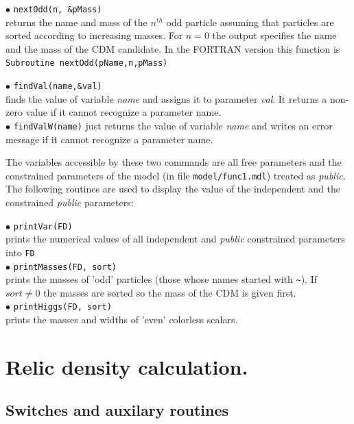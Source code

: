 \documentclass[12pt,a4paper]{article}
\begin{document}
\noindent
$\bullet$  \verb|nextOdd(n, &pMass)| \\
returns the name and mass of the $n^{th}$ odd particle assuming that particles are 
sorted according to increasing masses. For $n=0$ the output specifies the 
name and the mass of the CDM candidate. In the FORTRAN version this function 
is \verb|Subroutine nextOdd(pName,n,pMass)| 

\noindent
$\bullet$ \verb|findVal(name,&val)|\\
 finds the  value of
 variable  {\it name} and assigns it to parameter {\it val}. It returns a non-zero
value  if it cannot recognize  a parameter name.\\


\noindent
$\bullet$ \verb|findValW(name)| 
just returns the value of variable {\it name} and writes an error message
if it cannot recognize  a parameter name.

The variables accessible by these two commands are all free parameters and   the 
constrained parameters of the model (in file \verb|model/func1.mdl|)
treated as {\it public}. \\


The following routines are used to display the value of the independent and the constrained 
{\it public}
parameters: 


\noindent
$\bullet$ \verb|printVar(FD)|\\ 
prints the numerical values of all independent and {\it public} 
constrained parameters into \verb|FD|\\
$\bullet$ \verb|printMasses(FD, sort)|\\
 prints the masses of 'odd' particles
(those whose names  started with \verb|~|). If $sort\ne 0$
the masses are sorted so the mass of the CDM is given first.\\
$\bullet$ \verb|printHiggs(FD, sort)|\\
prints the masses and widths of 'even' colorless scalars.\\


\section{Relic density calculation.}
\subsection{Switches and auxilary routines}
\end{document}
